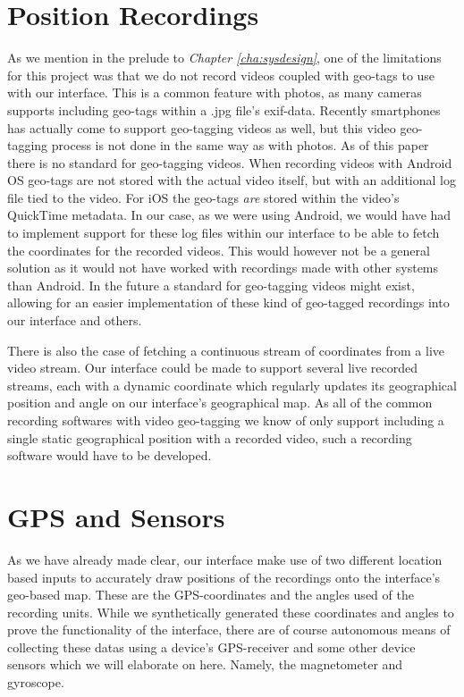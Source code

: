 \section{Position Recordings}
\label{sec:positionrecordings}
As we mention in the prelude to \textit{Chapter \ref{cha:sysdesign}}, one of the limitations for this project was that we do not record videos coupled with geo-tags to use with our interface. This is a common feature with photos, as many cameras supports including geo-tags within a .jpg file's exif-data. Recently smartphones has actually come to support geo-tagging videos as well, but this video geo-tagging process is not done in the same way as with photos. As of this paper there is no standard for geo-tagging videos. When recording videos with Android OS geo-tags are not stored with the actual video itself, but with an additional log file tied to the video. For iOS the geo-tags \textit{are} stored within the video's QuickTime metadata. In our case, as we were using Android, we would have had to implement support for these log files within our interface to be able to fetch the coordinates for the recorded videos. This would however not be a general solution as it would not have worked with recordings made with other systems than Android. In the future a standard for geo-tagging videos might exist, allowing for an easier implementation of these kind of geo-tagged recordings into our interface and others. 

There is also the case of fetching a continuous stream of coordinates from a live video stream. Our interface could be made to support several live recorded streams, each with a dynamic coordinate which regularly updates its geographical position and angle on our interface's geographical map. As all of the common recording softwares with video geo-tagging we know of only support including a single static geographical position with a recorded video, such a recording software would have to be developed.

\section{GPS and Sensors}
\label{sec:gpsandsensors}
As we have already made clear, our interface make use of two different location based inputs to accurately draw positions of the recordings onto the interface’s geo-based map. These are the GPS-coordinates and the angles used of the recording units. While we synthetically generated these coordinates and angles to prove the functionality of the interface, there are of course autonomous means of collecting these datas using a device's GPS-receiver and some other device sensors which we will elaborate on here. Namely, the magnetometer and gyroscope.

